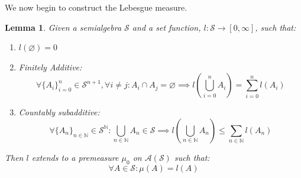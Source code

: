 \documentclass[10pt,letterpaper]{article} %
\newtheorem{lem}{Lemma}[section]
\begin{document}
We now begin to construct the Lebesgue measure.
\begin{lem}\label{Lemma 1.13}
Given a semialgebra $\mathcal{S}$ and a set function, $l: \mathcal{S} \xrightarrow{} [0, \infty]$, such that:
\begin{enumerate}
\item $l(\varnothing) = 0$
\item Finitely Additive:
\begin{equation*}
\forall \{A_i\}_{i=0}^n \in \mathcal{S}^{n+1}, \forall i \neq j: A_i \cap A_j = \varnothing \implies l\left(\bigcup_{i=0}^n A_i\right) = \sum_{i=0}^n l(A_i)
\end{equation*}
\item Countably subadditive:
\begin{equation*}
\forall \{A_n\}_{n \in \mathbb{N}} \in \mathcal{S}^\mathbb{N}: \bigcup_{n \in \mathbb{N}}A_n \in \mathcal{S} \implies l\left(\bigcup_{n \in \mathbb{N}} A_n\right) \leqslant \sum_{n \in \mathbb{N}} l(A_n)
\end{equation*}
\end{enumerate}
Then $l$ extends to a premeasure $\mu_0$ on $\mathcal{A}(\mathcal{S})$ such that:
\begin{equation*}
\forall A \in \mathcal{S}: \mu(A) = l(A)
\end{equation*}
\end{lem}
\end{document}
